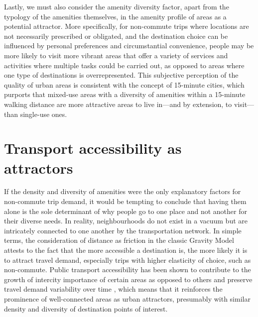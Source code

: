 Lastly, we must also consider the amenity diversity factor, apart from the typology of the amenities themselves, in the amenity profile of areas as a potential attractor. More specifically, for non-commute trips where locations are not necessarily prescribed or obligated, and the destination choice can be influenced by personal preferences and circumstantial convenience, people may be more likely to visit more vibrant areas that offer a variety of services and activities where multiple tasks could be carried out, as opposed to areas where one type of destinations is overrepresented. This subjective perception of the quality of urban areas is consistent with the concept of 15-minute cities, which purports that mixed-use areas with a diversity of amenities within a 15-minute walking distance are more attractive areas to live in---and by extension, to visit---than single-use ones. \citep{khavarian-garmsirGardenCity15Minute2023}

\section{Transport accessibility as attractors}

If the density and diversity of amenities were the only explanatory factors for non-commute trip demand, it would be tempting to conclude that having them alone is the sole determinant of why people go to one place and not another for their diverse needs. In reality, neighbourhoods do not exist in a vacuum but are intricately connected to one another by the transportation network. In simple terms, the consideration of distance as friction in the classic Gravity Model attests to the fact that the more accessible a destination is, the more likely it is to attract travel demand, especially trips with higher elasticity of choice, such as non-commute. Public transport accessibility has been shown to contribute to the growth of intercity importance of certain areas as opposed to others and preserve travel demand variability over time \citep{zhongMeasuringVariabilityMobility2015}, which means that it reinforces the prominence of well-connected areas as urban attractors, presumably with similar density and diversity of destination points of interest. 

